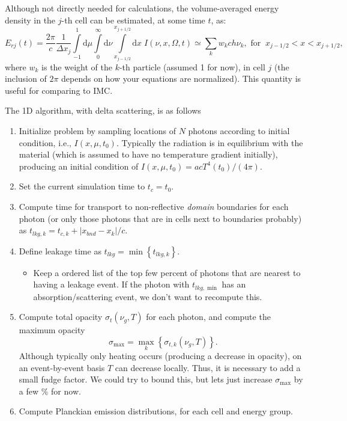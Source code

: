 \documentclass{article}
\renewcommand{\d}{\mathrm{d}}
\newcommand{\xl}{{x_{j-1/2}}}
\newcommand{\xr}{{x_{j+1/2}}}
\begin{document}
 Although not directly needed for calculations, the volume-averaged energy density in the $j$-th cell can be estimated, at some time
$t$, as:
\begin{equation}
 E_{rj}(t) = \frac{2\pi}{c} \frac{1}{\Delta x_j} \int\limits_{-1}^1 \d \mu \int\limits_0^\infty \d \nu \int\limits_\xl^\xr \d x \; I(\nu,x,\Omega,t)  
		\simeq \sum_k w_k c h \nu_k, \text{ for} \;\;\xl < x < \xr,
\end{equation}
where $w_k$ is the weight of the $k$-th particle (assumed 1 for now), in cell
$j$ (the inclusion of $2\pi$ depends on how your equations are normalized). This
quantity is useful for comparing to IMC.


The 1D algorithm, with delta scattering, is as follows
\begin{enumerate}
\item Initialize problem by sampling locations of $N$ photons according to
initial condition, i.e., $I(x,\mu,t_0)$.  Typically the radiation is in
equilibrium with the material (which is assumed to have no temperature gradient
initially), producing an initial condition of $I(x,\mu,t_0)
= acT^4(t_0)/(4\pi)$. 
\item Set the current simulation time to $t_{c}=t_0$.
\item Compute time for transport to non-reflective \emph{domain} boundaries 
for each photon (or only those photons that are in cells next to boundaries
probably) as $t_{lkg,k} = t_{c,k} + |x_{bnd} - x_k|/c$.  
\item Define leakage time as $t_{lkg} = \min\left\{t_{lkg,k}\right\}$.
\begin{itemize}
\item Keep a ordered list of the top few percent of photons that are nearest to having a
leakage event.  If the photon with $t_{lkg,\min}$ has an absorption/scattering event, we don't
want to recompute this.  
\end{itemize}
\item Compute total opacity $\sigma_t(\nu_g,T)$ for each photon, and compute the
maximum opacity
\begin{equation}
   \sigma_{\max} = \max_k\left\{\sigma_{t,k}(\nu_g,T)\right\}.
\end{equation}
Although typically only heating occurs (producing a decrease in opacity), on an
event-by-event basis $T$ can decrease locally.  Thus, it is necessary to add a
small fudge factor.  We could try to bound this, but lets just increase
$\sigma_{\max}$ by a few \% for now.  
\item Compute Planckian emission distributions, for each cell and energy group.

\end{enumerate}
\end{document}
